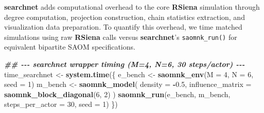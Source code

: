 \documentclass[
]{article}
\newenvironment{Shaded}{\begin{snugshade}}{\end{snugshade}}
\newcommand{\AttributeTok}[1]{\textcolor[rgb]{0.13,0.29,0.53}{#1}}
\newcommand{\DecValTok}[1]{\textcolor[rgb]{0.00,0.00,0.81}{#1}}
\newcommand{\DocumentationTok}[1]{\textcolor[rgb]{0.56,0.35,0.01}{\textbf{\textit{#1}}}}
\newcommand{\FloatTok}[1]{\textcolor[rgb]{0.00,0.00,0.81}{#1}}
\newcommand{\FunctionTok}[1]{\textcolor[rgb]{0.13,0.29,0.53}{\textbf{#1}}}
\newcommand{\NormalTok}[1]{#1}
\newcommand{\OtherTok}[1]{\textcolor[rgb]{0.56,0.35,0.01}{#1}}
\newcommand{\SpecialCharTok}[1]{\textcolor[rgb]{0.81,0.36,0.00}{\textbf{#1}}}
\begin{document}
\textbf{searchnet} adds computational overhead to the core
\textbf{RSiena} simulation through degree computation, projection
construction, chain statistics extraction, and visualization data
preparation. To quantify this overhead, we time matched simulations
using raw \textbf{RSiena} calls versus \textbf{searchnet}'s
\texttt{saomnk\_run()} for equivalent bipartite SAOM specifications.

\begin{Shaded}
\begin{Highlighting}[]
\DocumentationTok{\#\# {-}{-}{-} searchnet wrapper timing (M=4, N=6, 30 steps/actor) {-}{-}{-}}
\NormalTok{time\_searchnet }\OtherTok{\textless{}{-}} \FunctionTok{system.time}\NormalTok{(\{}
\NormalTok{  e\_bench }\OtherTok{\textless{}{-}} \FunctionTok{saomnk\_env}\NormalTok{(}\AttributeTok{M =} \DecValTok{4}\NormalTok{, }\AttributeTok{N =} \DecValTok{6}\NormalTok{, }\AttributeTok{seed =} \DecValTok{1}\NormalTok{)}
\NormalTok{  m\_bench }\OtherTok{\textless{}{-}} \FunctionTok{saomnk\_model}\NormalTok{(}
    \AttributeTok{density =} \SpecialCharTok{{-}}\FloatTok{0.5}\NormalTok{,}
    \AttributeTok{influence\_matrix =} \FunctionTok{saomnk\_block\_diagonal}\NormalTok{(}\DecValTok{6}\NormalTok{, }\DecValTok{2}\NormalTok{)}
\NormalTok{  )}
  \FunctionTok{saomnk\_run}\NormalTok{(e\_bench, m\_bench, }\AttributeTok{steps\_per\_actor =} \DecValTok{30}\NormalTok{, }\AttributeTok{seed =} \DecValTok{1}\NormalTok{)}
\NormalTok{\})}


\end{Highlighting}
\end{Shaded}
\end{document}
